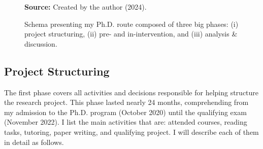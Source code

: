\begin{figure}[ht!]
\centering

\caption{\textmd{Schema presenting my \acrshort{Ph.D.} route composed of three big phases: (i) project structuring, (ii) pre- and in-intervention, and (iii) analysis \& discussion.}}
\label{fig:phd-route}

\par\medskip\ABNTEXfontereduzida\selectfont\textbf{Source:} Created by the author (2024).
\end{figure}

\subsection{Project Structuring}
\label{phd-route-ss:proj-str}

The first phase covers all activities and decisions responsible for helping structure the research project. This phase lasted nearly 24 months, comprehending from my admission to the \gls{Ph.D.} program (October 2020) until the qualifying exam (November 2022). I list the main activities that are: attended courses, reading tasks, tutoring, paper writing, and qualifying project. I will describe each of them in detail as follows.

